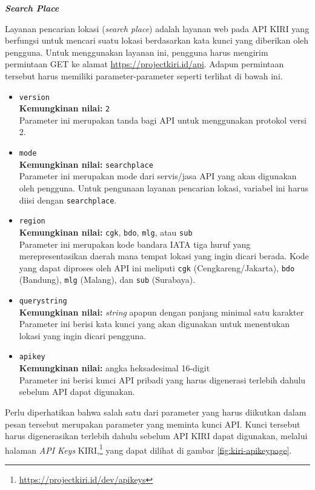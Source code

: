 \documentclass[a4paper,twoside]{article}
\begin{document}
\begin{enumerate}
\vspace{\baselineskip}
\textbf{\textit{\large{Search Place}}}
\label{sec:kiri-api-searchplace}

Layanan pencarian lokasi (\textit{search place}) adalah layanan web pada API KIRI yang berfungsi untuk mencari suatu lokasi berdasarkan kata kunci yang diberikan oleh pengguna. Untuk menggunakan layanan ini, pengguna harus mengirim permintaan GET ke alamat \href{https://projectkiri.id/api}{https://projectkiri.id/api}. Adapun permintaan tersebut harus memiliki parameter-parameter seperti terlihat di bawah ini.

\begin{itemize}
	\item \verb|version|\\
	\textbf{Kemungkinan nilai:} \verb|2|\\
	Parameter ini merupakan tanda bagi API untuk menggunakan protokol versi 2.
	\item \verb|mode|\\
	\textbf{Kemungkinan nilai:} \verb|searchplace|\\
	Parameter ini merupakan mode dari servis/jasa API yang akan digunakan oleh pengguna. Untuk pengunaan layanan pencarian lokasi, variabel ini harus diisi dengan \verb|searchplace|.
	\item \verb|region|\\
	\textbf{Kemungkinan nilai:} \verb|cgk|, \verb|bdo|, \verb|mlg|, atau \verb|sub|\\
	Parameter ini merupakan kode bandara IATA tiga huruf yang merepresentasikan daerah mana tempat lokasi yang ingin dicari berada. Kode yang dapat diproses oleh API ini meliputi \verb|cgk| (Cengkareng/Jakarta), \verb|bdo| (Bandung), \verb|mlg| (Malang), dan \verb|sub| (Surabaya).
	\item \verb|querystring|\\
	\textbf{Kemungkinan nilai:} \textit{string} apapun dengan panjang minimal satu karakter\\
	Parameter ini berisi kata kunci yang akan digunakan untuk menentukan lokasi yang ingin dicari pengguna.
	\item \verb|apikey|\\
	\textbf{Kemungkinan nilai:} angka heksadesimal 16-digit\\
	Parameter ini berisi kunci API pribadi yang harus digenerasi terlebih dahulu sebelum API dapat digunakan.
\end{itemize}

Perlu diperhatikan bahwa salah satu dari parameter yang harus diikutkan dalam pesan tersebut merupakan parameter yang meminta kunci API. Kunci tersebut harus digenerasikan terlebih dahulu sebelum API KIRI dapat digunakan, melalui halaman \textit{API Keys} KIRI,\footnote{\href{https://projectkiri.id/dev/apikeys}{https://projectkiri.id/dev/apikeys}} yang dapat dilihat di gambar \ref{fig:kiri-apikeypage}.


\end{enumerate}
\end{document}
